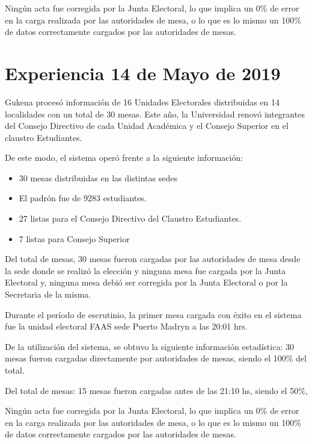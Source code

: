 Ningún acta fue corregida por la Junta Electoral, lo que implica un 0\% de error en la carga realizada por las autoridades de mesa, o lo que es lo mismo un 100\% de datos correctamente cargados por las autoridades de mesas.

\section{Experiencia 14 de Mayo de 2019}
Gukena procesó información de 16 Unidades Electorales distribuidas en 14 localidades con un total de 30 mesas. Este año, la Universidad renovó integrantes del Consejo Directivo de cada Unidad Académica y el Consejo Superior en el claustro Estudiantes.

De este modo, el sistema operó frente a la siguiente información:
\begin{itemize}
    \item 30 mesas distribuidas en las distintas sedes
     \item El padrón fue de  9283 estudiantes.
     \item 27 listas para el Consejo Directivo del Claustro Estudiantes.
     \item 7 listas para Consejo Superior
\end{itemize}
Del total de mesas, 30 mesas fueron cargadas por las autoridades de mesa desde la sede donde se realizó la elección y ninguna mesa fue cargada por la Junta Electoral y, ninguna mesa debió ser corregida por la Junta Electoral o por la Secretaria de la misma.

Durante el período de escrutinio, la primer mesa cargada con éxito en el sistema fue la unidad electoral FAAS sede Puerto Madryn a las 20:01 hrs.

De la utilización del sistema, se obtuvo la siguiente información estadística:
30 mesas fueron cargadas directamente por autoridades de mesas, siendo el 100\% del total.

Del total de mesas:
15 mesas fueron cargadas antes de las 21:10 hs, siendo el 50\%,

Ningún acta fue corregida por la Junta Electoral, lo que implica un 0\% de error en la carga realizada por las autoridades de mesa, o lo que es lo mismo un 100\% de datos correctamente cargados por las autoridades de mesas.


